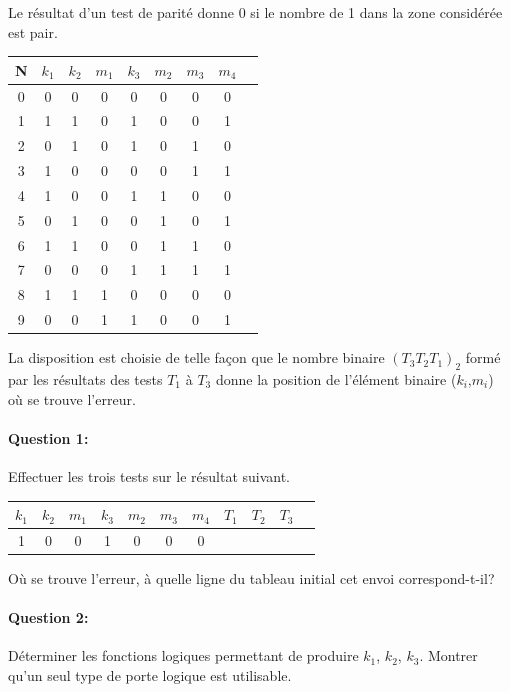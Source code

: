 Le résultat d'un test de parité donne 0 si le nombre de 1 dans la zone considérée est pair.

\begin{center}
\begin{tabular}{|c|c|c|c|c|c|c|c|c|}
\hline
N  & $k_1$ & $k_2$ & $m_1$ & $k_3$ & $m_2$ & $m_3$ & $m_4$ \\
\hline
0 & 0 & 0 & 0 & 0 & 0 & 0 & 0 \\
\hline
1 & 1 & 1 & 0 & 1 & 0 & 0 & 1 \\
\hline
2 & 0 & 1 & 0 & 1 & 0 & 1 & 0 \\
\hline
3 & 1 & 0 & 0 & 0 & 0 & 1 & 1 \\
\hline
4 & 1 & 0 & 0 & 1 & 1 & 0 & 0 \\
\hline
5 & 0 & 1 & 0 & 0 & 1 & 0 & 1 \\
\hline
6 & 1 & 1 & 0 & 0 & 1 & 1 & 0 \\
\hline
7 & 0 & 0 & 0 & 1 & 1 & 1 & 1 \\
\hline
8 & 1 & 1 & 1 & 0 & 0 & 0 & 0 \\
\hline
9 & 0 & 0 & 1 & 1 & 0 & 0 & 1 \\
\hline
\end{tabular} 
\end{center}

La disposition est choisie de telle façon que le nombre binaire $(T_3T_2T_1)_2$ formé par les résultats des tests $T_1$ à $T_3$ donne la position de l'élément binaire ($k_i$,$m_i$) où se trouve l'erreur.

\paragraph{Question 1:} Effectuer les trois tests sur le résultat suivant.

\begin{center}
\begin{tabular}{|c|c|c|c|c|c|c|c|c|c|c|}
\hline
$k_1$ & $k_2$ & $m_1$ & $k_3$ & $m_2$ & $m_3$ & $m_4$ & $T_1$ & $T_2$ & $T_3$\\
\hline
1 & 0 & 0 & 1 & 0 & 0 & 0 & & & \\
\hline
\end{tabular} 
\end{center}

Où se trouve l'erreur, à quelle ligne du tableau initial cet envoi correspond-t-il?

\paragraph{Question 2:} Déterminer les fonctions logiques permettant de produire $k_1$, $k_2$, $k_3$. Montrer qu'un seul type de porte logique est utilisable.

